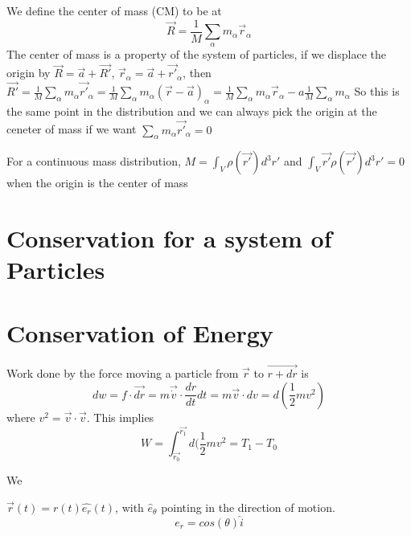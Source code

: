 \documentclass{homework}
\begin{document}
We define the center of mass (CM) to be at
\[\vec{R} = \frac{1}{M}\sum_{\alpha}m_{\alpha}\vec{r}_{\alpha}\]
The center of mass is a property of the system of particles, if we displace the origin by $\vec{R} = \vec{a} + \vec{R'}$, $\vec{r}_{\alpha} = \vec{a} + \vec{r'}_{\alpha}$, then $\vec{R'} = \frac{1}{M}\sum_{\alpha}m_{\alpha}\vec{r'}_{\alpha} = \frac{1}{M}\sum_{\alpha}m_{\alpha}(\vec{r} - \vec{a})_{\alpha} = \frac{1}{M}\sum_{\alpha}m_{\alpha}\vec{r}_{\alpha} -a\frac{1}{M}\sum_{\alpha} m_{\alpha}$
So this is the same point in the distribution and we can always pick the origin at the ceneter of mass if we want $\sum_{\alpha}m_{\alpha}\vec{r'}_{\alpha} = 0$


For a continuous mass distribution, $M = \int_{V} \rho(\vec{r'})d^3r'$ and $ \int_{V} \vec{r'}\rho(\vec{r'})d^3r' = 0$ when the origin is the center of mass
\section{Conservation for a system of Particles}








\section{Conservation of Energy}

Work done by the force moving a particle from $\vec{r}$ to $\vec{r + dr}$ is 
\[dw = f\cdot \vec{dr} = m\vec{\dot{v}} \cdot \frac{dr}{dt}dt = m\vec{v} \cdot dv = d(\frac{1}{2}mv^2) \]
where $v^2 = \vec{v} \cdot \vec{v}$. This implies 
\[W = \int_{\vec{r_0}}^{\vec{r_1}}d(\frac{1}{2}mv^2 = T_1 - T_0 \]





We 





$\vec{r}(t) = r(t)\hat{e_r}(t)$, with $\hat e_{\theta}$ pointing in the direction of motion.
\[e_r = cos(\theta)\hat i\]
\end{document}
